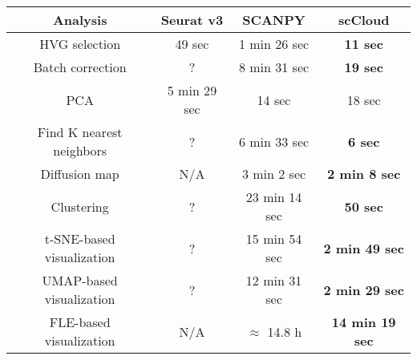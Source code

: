 \documentclass[10pt]{article}
\begin{document}
\begin{table}[H]
	\centering
	\begin{tabular}{|c|c|c|c|}
		\hline
		Analysis & Seurat v3 & SCANPY & scCloud\\
		\hline \hline
		HVG selection & 49 sec & 1 min 26 sec & \textbf{11 sec} \\
		\hline
		Batch correction & ? & 8 min 31 sec & \textbf{19 sec} \\
		\hline
		PCA & 5 min 29 sec & 14 sec & 18 sec \\
		\hline
		Find K nearest neighbors &  ? &  6 min 33 sec & \textbf{6 sec}\\
		\hline
		Diffusion map & N/A & 3 min 2 sec & \textbf{2 min 8 sec} \\
		\hline 
		Clustering & ? & 23 min 14 sec & \textbf{50 sec}\\
		\hline
		t-SNE-based visualization & ? & 15 min 54 sec & \textbf{2 min 49 sec}\\
		\hline
		UMAP-based visualization & ? & 12 min 31 sec & \textbf{2 min 29 sec}\\
		\hline
		FLE-based visualization & N/A & $\approx$ 14.8  h & \textbf{14 min 19 sec}\\
		\hline
	\end{tabular}
\end{table}
\end{document}
